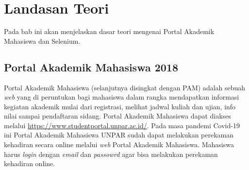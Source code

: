 \chapter{Landasan Teori}
\label{chap:teori}
Pada bab ini akan menjelaskan dasar teori mengenai Portal Akademik Mahasiswa dan Selenium. 

\section{Portal Akademik Mahasiswa 2018}
\label{sec:pam} 
Portal Akademik Mahasiswa (selanjutnya disingkat dengan PAM) adalah sebuah \textit{web} yang di peruntukan bagi mahasiswa dalam rangka mendapatkan informasi kegiatan akademik mulai dari registrasi, melihat jadwal kuliah dan ujian, info nilai sampai pendaftaran sidang\cite{portalunpar}. Portal Akademik Mahasiswa dapat diakses melalui \url{https://www.studentportal.unpar.ac.id/}. Pada masa pandemi Covid-19 ini Portal Akademik Mahasiswa UNPAR sudah dapat melakukan perekaman kehadiran secara online melalui \textit{web} Portal Akademik Mahasiswa. Mahasiswa harus \textit{login} dengan \textit{email} dan \textit{passowrd} agar bisa melakukan perekaman kehadiran online.


